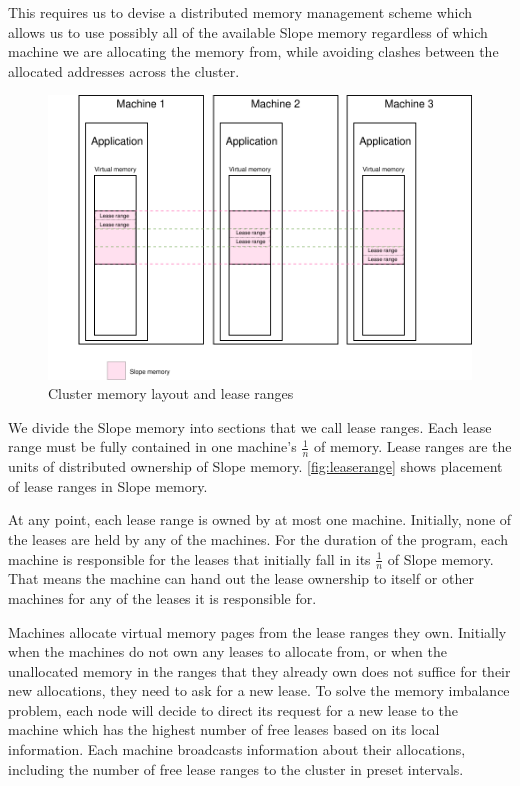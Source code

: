 This requires us to devise a distributed memory management scheme which allows
us to use possibly all of the available Slope memory regardless of which
machine we are allocating the memory from, while avoiding clashes
between the allocated addresses across the cluster.


\begin{figure}[t]
\centering
{}
\includegraphics[width=1\textwidth]{leaserange.drawio}
\caption{
    Cluster memory layout and lease ranges
}
\label{fig:leaserange}
\end{figure}


We divide the Slope memory into sections that we call lease ranges. Each lease
range must be fully contained in one machine's $\frac{1}{n}$ of memory.
Lease ranges are the units of distributed ownership of Slope memory.
\autoref{fig:leaserange} shows placement of lease ranges
in Slope memory.


At any point, each lease range is owned by at most
one machine. Initially, none of the leases are held by any of the machines.
For the duration of the program, each machine is responsible for
the leases that initially fall in its $\frac{1}{n}$ of Slope memory.
That means the machine can hand out
the lease ownership to itself or other machines for any of the leases it is
responsible for.


Machines allocate virtual memory pages from the lease ranges they own. Initially
when
the machines do not own any leases to allocate from, or when the unallocated
memory in the
ranges that they already own does not suffice for their new allocations, they
need to ask for a new lease. To solve the memory imbalance problem, each node
will decide to direct its request for a new lease to the machine which
has the highest number of free leases based on its local information.
Each machine broadcasts information about their allocations, including
the number of free lease ranges to the cluster in preset intervals.

